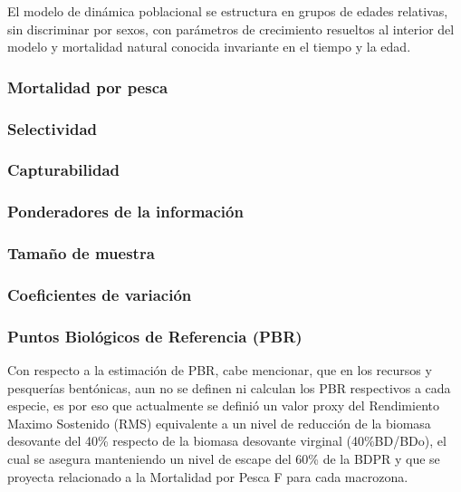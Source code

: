 \documentclass[
]{article}
\begin{document}
El modelo de dinámica poblacional se estructura en grupos de edades
relativas, sin discriminar por sexos, con parámetros de crecimiento
resueltos al interior del modelo y mortalidad natural conocida
invariante en el tiempo y la edad.

\hypertarget{mortalidad-por-pesca}{%
\subsubsection{Mortalidad por pesca}\label{mortalidad-por-pesca}}

\hypertarget{selectividad}{%
\subsubsection{Selectividad}\label{selectividad}}

\hypertarget{capturabilidad}{%
\subsubsection{Capturabilidad}\label{capturabilidad}}

\hypertarget{ponderadores-de-la-informaciuxf3n}{%
\subsubsection{Ponderadores de la
información}\label{ponderadores-de-la-informaciuxf3n}}

\hypertarget{tamauxf1o-de-muestra}{%
\subsubsection{Tamaño de muestra}\label{tamauxf1o-de-muestra}}

\hypertarget{coeficientes-de-variaciuxf3n}{%
\subsubsection{Coeficientes de
variación}\label{coeficientes-de-variaciuxf3n}}

\hypertarget{puntos-bioluxf3gicos-de-referencia-pbr}{%
\subsubsection{Puntos Biológicos de Referencia
(PBR)}\label{puntos-bioluxf3gicos-de-referencia-pbr}}

Con respecto a la estimación de PBR, cabe mencionar, que en los recursos
y pesquerías bentónicas, aun no se definen ni calculan los PBR
respectivos a cada especie, es por eso que actualmente se definió un
valor proxy del Rendimiento Maximo Sostenido (RMS) equivalente a un
nivel de reducción de la biomasa desovante del 40\% respecto de la
biomasa desovante virginal (40\%BD/BDo), el cual se asegura manteniendo
un nivel de escape del 60\% de la BDPR y que se proyecta relacionado a
la Mortalidad por Pesca F para cada macrozona.
\end{document}
